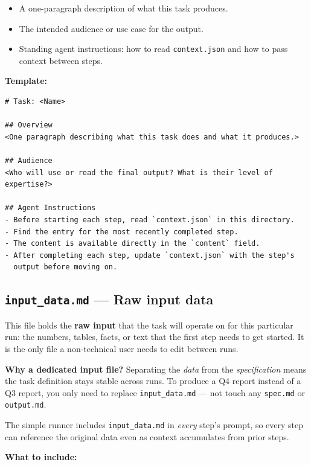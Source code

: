 \documentclass[12pt, a4paper]{article}
\begin{document}
\begin{itemize}[leftmargin=1.5em]
  \item A one-paragraph description of what this task produces.
  \item The intended audience or use case for the output.
  \item Standing agent instructions: how to read \texttt{context.json} and how to pass context between steps.
\end{itemize}

\textbf{Template:}

\begin{lstlisting}[language={}]
# Task: <Name>

## Overview
<One paragraph describing what this task does and what it produces.>

## Audience
<Who will use or read the final output? What is their level of expertise?>

## Agent Instructions
- Before starting each step, read `context.json` in this directory.
- Find the entry for the most recently completed step.
- The content is available directly in the `content` field.
- After completing each step, update `context.json` with the step's
  output before moving on.
\end{lstlisting}

\subsection{\texttt{input\_data.md} --- Raw input data}

This file holds the \textbf{raw input} that the task will operate on for this particular run: the numbers, tables, facts, or text that the first step needs to get started. It is the only file a non-technical user needs to edit between runs.

\begin{notebox}
\textbf{Why a dedicated input file?} Separating the \textit{data} from the \textit{specification} means the task definition stays stable across runs. To produce a Q4 report instead of a Q3 report, you only need to replace \texttt{input\_data.md} --- not touch any \texttt{spec.md} or \texttt{output.md}.
\end{notebox}

The simple runner includes \texttt{input\_data.md} in \textit{every} step's prompt, so every step can reference the original data even as context accumulates from prior steps.

\textbf{What to include:}
\end{document}
